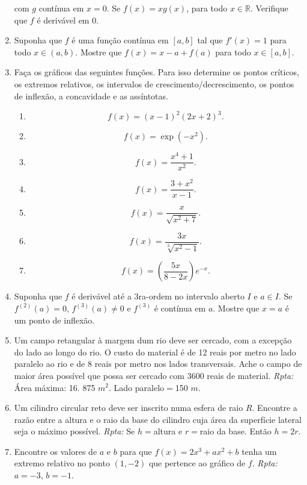 \documentclass[latin,20pt]{article}
\begin{document}
\begin{enumerate}
      com $g$ contínua em $x=0$. Se $f(x)=xg(x)$, 
      para todo $x \in \mathbb{R}$. 
      Verifique que $f$ é derivável em $0$.
      \item Suponha que $f$ é uma função contínua em $[a,b]$ tal que $f'(x)=1$ para todo $x \in (a,b)$. Mostre que 
      $f(x)=x-a+f(a)$ para todo $x \in [a,b]$.
      \item Faça os gráficos das seguintes funções. Para isso
      determine os pontos críticos, os extremos relativos, os intervalos de crescimento/decrescimento, os pontos de 
      inflexão, a concavidade e as assíntotas.
        \begin{enumerate}
        \item  $$  f(x)=(x-1)^{2}(2x+2)^{3}. $$	
        \item  $$  f(x)=\exp(-x^2).         $$ 
        \item  $$  f(x)=\frac{x^4+1}{x^2}.  $$
        \item  $$  f(x)=\frac{3+x^2}{x-1}.  $$
        \item  $$  f(x)=\frac{x}{\sqrt{x^2+7}}.  $$
        \item  $$  f(x)=\frac{3x}{\sqrt[3]{x^2-1}}.  $$
        \item  $$  f(x)=\left(\frac{5x}{8-2x}\right)e^{-x}.  $$
        \end{enumerate} 
        \item Suponha que $f$ é derivável até a $3$ra-ordem 
        no intervalo aberto $I$ e $a \in I$. 
        Se $f^{(2)}(a)=0$, $f^{(3)}(a)\neq 0$ e $f^{(3)}$
        é contínua em $a$. Mostre que $x=a$ é 
        um ponto de inflexão. 
        \item Um campo retangular à margem dum rio deve ser cercado, com a excepção do lado ao longo do rio. O custo do material é de 12 reais por metro no lado paralelo ao rio e de 8 reais por metro nos lados transversais. Ache o campo de maior área possível que possa ser cercado com 3600 reais de material.
        {\it Rpta: }  Área máxima: 16. 875 $m^{2}$. 
        Lado paralelo$=$150 $m$. 
        \item Um cilindro circular reto deve ser inscrito numa esfera de raio $R$. Encontre a razão entre a altura e o raio da base do cilindro cuja área da superfície lateral seja o máximo possível. {\it Rpta: } Se $h=$altura e $r=$raio da base. Então 
        $h=2r$.
        \item Encontre os valores de $a$ e $b$ para que 
        $f(x)=2x^{3}+ax^{2}+b$ tenha um extremo relativo no ponto $(1,-2)$ que pertence ao gráfico de $f$. {\it Rpta: } $a=-3$, $b=-1$.        

\end{enumerate}
\end{document}

